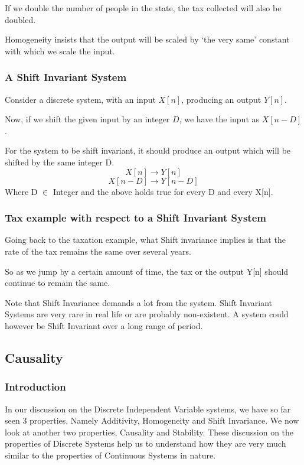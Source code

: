 If we double the number of people in the state, the tax collected will also be doubled. 

Homogeneity insists that the output will be scaled by ‘the very same’ constant with which we scale the input. 


\begin{figure}
\centering

\end{figure}



\subsubsection{A Shift Invariant System}
Consider a discrete system, with an input $X[n]$, producing an output $Y[n]$. 

Now, if we shift the given input by an integer $D$, we have the input as $X[n-D]$. 

For the system to be shift invariant, it should produce an output which will be shifted by the same integer D.
$$X[n]\rightarrow Y[n]$$
$$X[n-D]\rightarrow Y[n-D]$$
Where D $\in$ Integer and the above holds true for every D and every X[n].

\subsubsection{Tax example with respect to a Shift Invariant System}
Going back to the taxation example, what Shift invariance implies is that the rate of the tax remains the same over several years.

So as we jump by a certain amount of time, the tax or the output Y[n] should continue to remain the same.


Note that Shift Invariance demands a lot from the system. Shift Invariant Systems are very rare in real life or are probably non-existent. A system could however be Shift Invariant over a long range of period.

\pagebreak

\subsection{Causality}

\subsubsection{Introduction}

In our discussion on the Discrete Independent Variable systems, we have so far seen 3 properties. Namely Additivity, Homogeneity and Shift Invariance. We now look at another two properties, Causality and Stability. These discussion on the properties of Discrete Systems help us to understand how they are very much similar to the properties of Continuous Systems in nature. 

